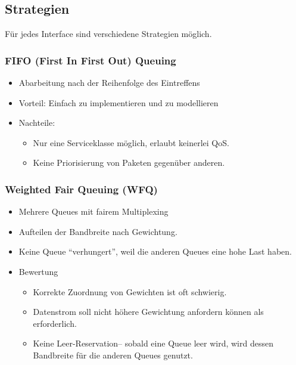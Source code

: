 \documentclass{article} %
\begin{document}
\subsection{Strategien}
Für jedes Interface sind verschiedene Strategien möglich. 	
\subsubsection{FIFO (First In First Out) Queuing}
	\begin{itemize}
	\item Abarbeitung nach der Reihenfolge des Eintreffens
	\item Vorteil: Einfach zu implementieren und zu modellieren
	\item Nachteile:
		\begin{itemize}
		\item Nur eine Serviceklasse möglich, erlaubt keinerlei QoS. 
		\item Keine Priorisierung von Paketen gegenüber anderen. 
		\end{itemize}
	\end{itemize}

\subsubsection{Weighted Fair Queuing (WFQ)}
	\begin{itemize}
	\item Mehrere Queues mit fairem Multiplexing
	\item Aufteilen der Bandbreite nach Gewichtung. 
	\item Keine Queue "`verhungert"',  weil die anderen Queues eine hohe Last haben. 
	\item Bewertung
		\begin{itemize}
		\item Korrekte Zuordnung von Gewichten ist oft schwierig.  
		\item Datenstrom soll nicht höhere Gewichtung anfordern können als erforderlich.
		\item Keine \glqq Leer-Reservation\grqq – sobald eine Queue leer wird, wird dessen Bandbreite für die anderen Queues genutzt. 
		\end{itemize}
	\end{itemize}
\end{document}
